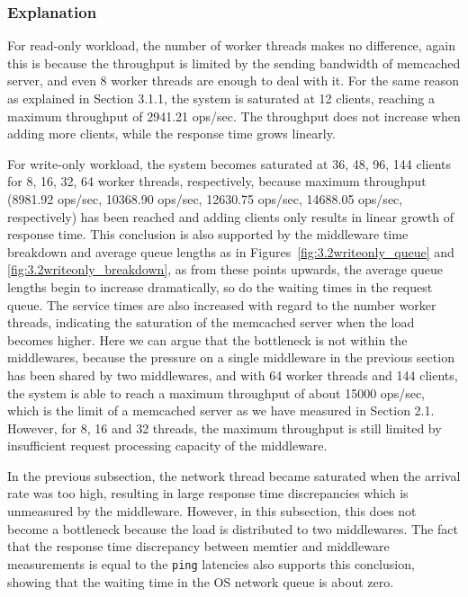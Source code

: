 \subsubsection{Explanation}


For read-only workload, the number of worker threads makes no difference, again this is because the throughput is limited by the sending bandwidth of memcached server, and even 8 worker threads are enough to deal with it. For the same reason as explained in Section 3.1.1, the system is saturated at 12 clients, reaching a maximum throughput of 2941.21 ops/sec. The throughput does not increase when adding more clients, while the response time grows linearly.

For write-only workload, the system becomes saturated at 36, 48, 96, 144 clients for 8, 16, 32, 64 worker threads, respectively, because maximum throughput (8981.92 ops/sec, 10368.90 ops/sec, 12630.75 ops/sec, 14688.05 ops/sec, respectively) has been reached and adding clients only results in linear growth of response time. This conclusion is also supported by the middleware time breakdown and average queue lengths as in Figures~\ref{fig:3.2writeonly_queue} and \ref{fig:3.2writeonly_breakdown}, as from these points upwards, the average queue lengths begin to increase dramatically, so do the waiting times in the request queue. The service times are also increased with regard to the number worker threads, indicating the saturation of the memcached server when the load becomes higher. Here we can argue that the bottleneck is not within the middlewares, because the pressure on a single middleware in the previous section has been shared by two middlewares, and with 64 worker threads and 144 clients, the system is able to reach a maximum throughput of about 15000 ops/sec, which is the limit of a memcached server as we have measured in Section 2.1. However, for 8, 16 and 32 threads, the maximum throughput is still limited by insufficient request processing capacity of the middleware.

In the previous subsection, the network thread became saturated when the arrival rate was too high, resulting in large response time discrepancies which is unmeasured by the middleware. However, in this subsection, this does not become a bottleneck because the load is distributed to two middlewares. The fact that the response time discrepancy between memtier and middleware measurements is equal to the \texttt{ping} latencies also supports this conclusion, showing that the waiting time in the OS network queue is about zero.

